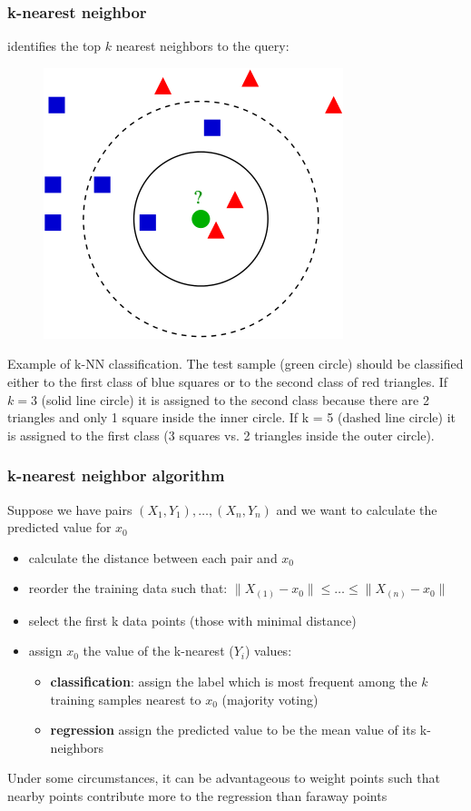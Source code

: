 \documentclass{beamer}
\begin{document}
\begin{frame}
\frametitle{k-nearest neighbor}
identifies the top $k$ nearest neighbors to the query:
\begin{figure}
\includegraphics[width=0.4\linewidth]{figures/03/KNN.png}
\end{figure}
\tiny
Example of k-NN classification. The test sample (green circle) should be classified either to the first class of blue squares or to the second class of red triangles. If $k = 3$ (solid line circle) it is assigned to the second class because there are 2 triangles and only 1 square inside the inner circle. If k = 5 (dashed line circle) it is assigned to the first class (3 squares vs. 2 triangles inside the outer circle).
\end{frame}
\begin{frame}
\frametitle{k-nearest neighbor algorithm}
Suppose we have pairs ${ (X_{1},Y_{1}),\dots ,(X_{n},Y_{n})}$ and we want to calculate the predicted value for $x_0$
\begin{itemize}
\item calculate the distance between each pair and $x_0$
\item reorder the training data such that: $\|X_{{(1)}}-x_0\|\leq \dots \leq \|X_{{(n)}}-x_0\|$
\item select the first k data points (those with minimal distance)
\item assign $x_0$ the value of the k-nearest ($Y_i$) values:
	\begin{itemize}
	\item \textbf{classification}: assign the label which is most frequent among the $k$ training samples nearest to $x_0$ (majority voting)
    \item \textbf{regression}
    assign the predicted value to be the mean value of its k-neighbors
	\end{itemize}
\end{itemize}
Under some circumstances, it can be advantageous to weight points such that nearby points contribute more to the regression than faraway points
\end{frame}
\end{document}
